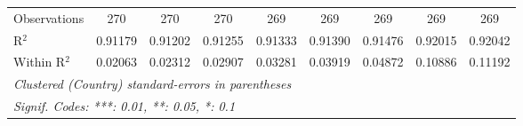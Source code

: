 \begin{table}[htbp]
\begin{tabular}{lcccccccc}
      Observations                            & 270            & 270           & 270      & 269      & 269      & 269      & 269      & 269\\  
      R$^2$                                   & 0.91179        & 0.91202       & 0.91255  & 0.91333  & 0.91390  & 0.91476  & 0.92015  & 0.92042\\  
      Within R$^2$                            & 0.02063        & 0.02312       & 0.02907  & 0.03281  & 0.03919  & 0.04872  & 0.10886  & 0.11192\\  
      \midrule \midrule
      \multicolumn{9}{l}{\emph{Clustered (Country) standard-errors in parentheses}}\\
      \multicolumn{9}{l}{\emph{Signif. Codes: ***: 0.01, **: 0.05, *: 0.1}}\\
   \end{tabular}
\end{table}


